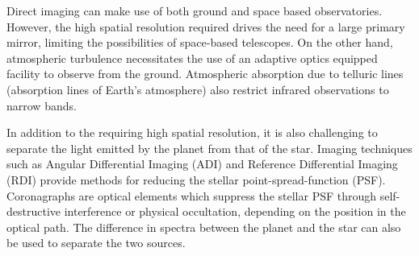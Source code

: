 Direct imaging can make use of both ground and space based observatories. 
However, the high spatial resolution required drives the need for a large primary mirror, limiting the possibilities of space-based telescopes. On the other hand, atmospheric turbulence necessitates the use of an adaptive optics equipped facility to observe from the ground. 
Atmospheric absorption due to telluric lines (absorption lines of Earth's atmosphere) also restrict infrared observations to narrow bands.

In addition to the requiring high spatial resolution, it is also challenging to separate the light emitted by the planet from that of the star.
Imaging techniques such as Angular Differential Imaging (ADI) \parencite{Marois2007} and Reference Differential Imaging (RDI) \parencite{Lefreniere2009,Soummer2012} provide methods for reducing the stellar point-spread-function (PSF). %
Coronagraphs are optical elements which suppress the stellar PSF through self-destructive interference or physical occultation, depending on the position in the optical path.
The difference in spectra between the planet and the star can also be used to separate the two sources.
 
